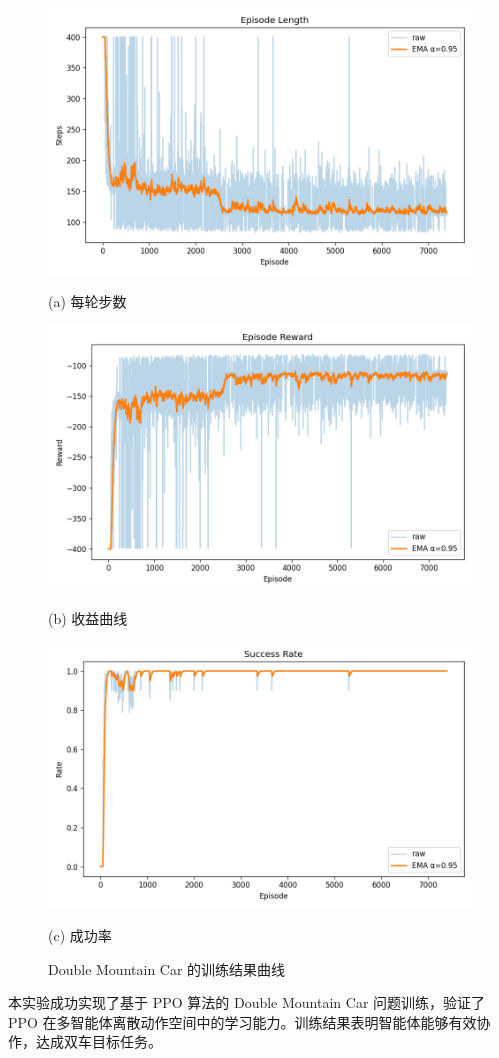 \documentclass[citestyle=gb7714-2015, bibstyle=gb7714-2015,lang=cn,14pt,scheme=chinese]{elegantbook}
\begin{document}
\begin{figure}[htbp]
    \centering
    \includegraphics[width=0.7\linewidth]{figure/double_mountain_car/episode_length.png}
    \par
    \centering (a) 每轮步数
    \par
    \includegraphics[width=0.7\linewidth]{figure/double_mountain_car/reward_curve.png}
    \par
    \centering (b) 收益曲线
    \par
    \includegraphics[width=0.7\linewidth]{figure/double_mountain_car/success_rate.png}
    \par
    \centering (c) 成功率
    \caption{Double Mountain Car 的训练结果曲线}
    \label{fig:ppo}
\end{figure}

本实验成功实现了基于 PPO 算法的 Double Mountain Car 问题训练，验证了 PPO 在多智能体离散动作空间中的学习能力。训练结果表明智能体能够有效协作，达成双车目标任务。
\end{document}
